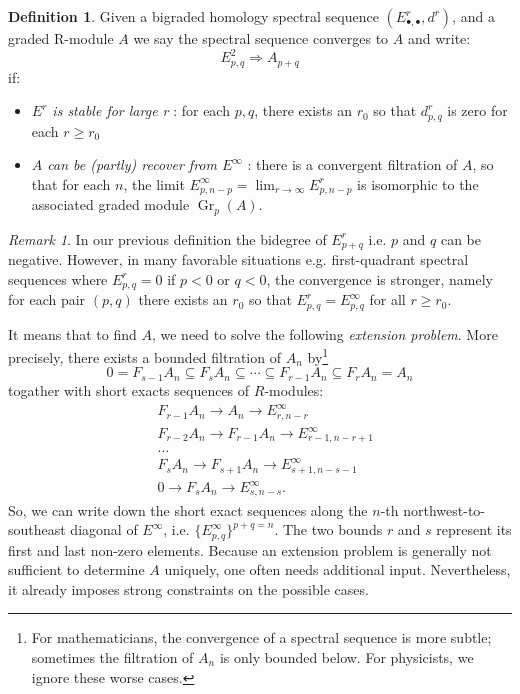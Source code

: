 \documentclass[a4paper,11pt]{article}
\theoremstyle{definition}
\newtheorem{definition}[theorem]{Definition}
\theoremstyle{remark}
\newtheorem{remark}[theorem]{Remark}
\begin{document}
\begin{definition}
	Given a bigraded homology spectral sequence $(E^r_{\bullet,\bullet},d^r)$, and a graded R-module $A$ we say the spectral sequence converges to $A$ and write:
	\[
	E_{p,q}^2\Rightarrow A_{p+q}
	\]
	if:
	\begin{itemize}
		\item {\itshape $E^r$ is stable for large r} : for each $p, q$, there exists an $r_0$ so that $d_{p,q}^r$ is zero for each $r \geq r_0$
		\item{\itshape $A$ can be (partly) recover from $E^\infty$} : there is a convergent filtration of $A$, so that for each $n$, the limit $E_{p,n-p}^\infty = \lim_{r\to\infty} E_{p,n-p}^r$ is isomorphic to the associated graded module  $\operatorname{Gr}_p(A)$.
	\end{itemize}
\end{definition}
\begin{remark}
	In our previous definition the bidegree of $E^r_{p+q}$ i.e. $p$ and $q$ can be negative. However, in many favorable situations e.g. first-quadrant spectral sequences where $E_{p,q}^r = 0 $ if $p < 0$ or $q < 0$, the convergence is stronger, namely for each pair $(p, q)$ there exists an $r_0$ so that $E_{p,q}^r = E_{p,q}^\infty$ for all $r \geq r_0$.
\end{remark}
It means that to find $A$, we need to solve the following {\itshape extension problem}. More precisely, there exists a bounded filtration of $A_n$ by\footnote{For mathematicians, the convergence of a spectral sequence is more subtle; sometimes the filtration of $A_n$ is only bounded below. For physicists, we ignore these worse cases.}
\[
 0=F_{s-1}A_n\subseteq F_sA_n\subseteq\cdots\subseteq F_{r-1}A_n\subseteq F_rA_n=A_n
\]
togather with short exacts sequences of $R$-modules:
\begin{equation}
	\label{extension}
\begin{aligned}
	&F_{r-1}A_n\to A_n\to E_{r,n-r}^\infty\\&F_{r-2}A_n\to F_{r-1}A_n\to E_{r-1,n-r+1}^{\infty}\\&\ldots\\&F_sA_n\to F_{s+1}A_n\to E_{s+1,n-s-1}^\infty\\&0\to F_sA_n\to E_{s,n-s}^\infty.
\end{aligned}
\end{equation}
So, we can write down the short exact sequences along the $n$-th northwest-to-southeast diagonal of $E^\infty$, i.e. $\{E^{\infty}_{p,q}\}^{p+q=n}$. The two bounds $r$ and $s$ represent its first and last non-zero elements. Because an extension problem is generally not sufficient to determine $A$ uniquely, one often needs additional input. Nevertheless, it already imposes strong constraints on the possible cases.
\end{document}
